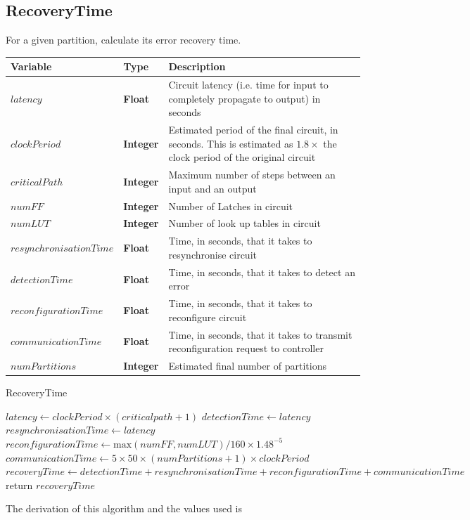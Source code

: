 \documentclass[12pt,final,oneside]{dwThesis} %
\begin{document}
   \newpage \subsection{RecoveryTime} For a given partition, calculate its
   error recovery time.  \begin{algorithm} \begin{center}
         \begin{tabularx}{\linewidth}{llX} \toprule Variable & Type &
            Description\\ \midrule $latency$ &\textbf{ Float } &  Circuit
            latency (i.e. time for input to completely propagate to output) in
            seconds\\ $clockPeriod$ &\textbf{ Integer } & Estimated period of
            the final circuit, in seconds. This is estimated as $1.8\times$ the
            clock period of the original circuit\\ $criticalPath$ &\textbf{
               Integer } &  Maximum number of steps between an input and an
            output\\ $numFF$ &\textbf{ Integer } &  Number of Latches in
            circuit\\ $numLUT$ &\textbf{ Integer } &  Number of look up tables
            in circuit\\ $resynchronisationTime$ &\textbf{ Float } &  Time, in
            seconds, that it takes to resynchronise circuit\\ $detectionTime$
            &\textbf{ Float } &  Time, in seconds, that it takes to detect an
            error\\ $reconfigurationTime$ &\textbf{ Float } &  Time, in
            seconds, that it takes to reconfigure circuit\\ $communicationTime$
            &\textbf{ Float } &  Time, in seconds, that it takes to transmit
            reconfiguration request to controller\\ $numPartitions$ &\textbf{
               Integer } &  Estimated final number of partitions \\ \bottomrule
         \end{tabularx} \end{center} \caption{RecoveryTime}\label{recoverytime}
      \begin{algorithmic}[1]  \State
         $latency \gets clockPeriod\times{}(criticalpath+1)$ \State
         $detectionTime \gets latency$ \State $resynchronisationTime \gets
         latency$ \State $reconfigurationTime \gets \mbox{max}(numFF,
         numLUT)/160\times 1.48^{-5}$ \State $communicationTime \gets 5\times
         50\times(numPartitions+1)\times clockPeriod$ \State $recoveryTime
         \gets
         detectionTime+resynchronisationTime+reconfigurationTime+communicationTime$
         \State return $recoveryTime$ \EndProcedure \end{algorithmic}
   \end{algorithm} The derivation of this algorithm and the values used is
\end{document}
